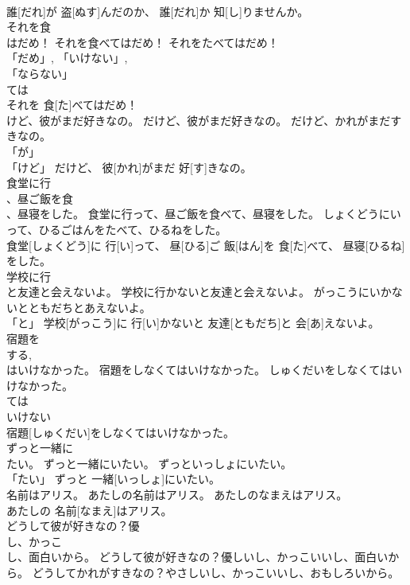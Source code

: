 \documentclass[8pt]{extreport}
\begin{document}
\begin{CJK}{UTF8}{min}
\\	誰[だれ]が 盗[ぬす]んだのか、 誰[だれ]か 知[し]りませんか。		
\\	それを食
\\	はだめ！	それを食べてはだめ！	それをたべてはだめ！	
\\	「だめ」, 「いけない」, 
\\	「ならない」 
\\	ては
\\	それを 食[た]べてはだめ！		
\\	けど、彼がまだ好きなの。	だけど、彼がまだ好きなの。	だけど、かれがまだすきなの。	
\\	「が」 
\\	「けど」	だけど、 彼[かれ]がまだ 好[す]きなの。		
\\	食堂に行
\\	、昼ご飯を食
\\	、昼寝をした。	食堂に行って、昼ご飯を食べて、昼寝をした。	しょくどうにいって、ひるごはんをたべて、ひるねをした。	
\\	食堂[しょくどう]に 行[い]って、 昼[ひる]ご 飯[はん]を 食[た]べて、 昼寝[ひるね]をした。		
\\	学校に行
\\	と友達と会えないよ。	学校に行かないと友達と会えないよ。	がっこうにいかないとともだちとあえないよ。	
\\	「と」	学校[がっこう]に 行[い]かないと 友達[ともだち]と 会[あ]えないよ。		
\\	宿題を
\\	する, 
\\	はいけなかった。	宿題をしなくてはいけなかった。	しゅくだいをしなくてはいけなかった。	
\\	ては
\\	いけない
\\	宿題[しゅくだい]をしなくてはいけなかった。		
\\	ずっと一緒に
\\	たい。	ずっと一緒にいたい。	ずっといっしょにいたい。	
\\	「たい」	ずっと 一緒[いっしょ]にいたい。		
\\	名前はアリス。	あたしの名前はアリス。	あたしのなまえはアリス。	
\\	あたしの 名前[なまえ]はアリス。		
\\	どうして彼が好きなの？優
\\	し、かっこ
\\	し、面白いから。	どうして彼が好きなの？優しいし、かっこいいし、面白いから。	どうしてかれがすきなの？やさしいし、かっこいいし、おもしろいから。	

\end{CJK}
\end{document}
